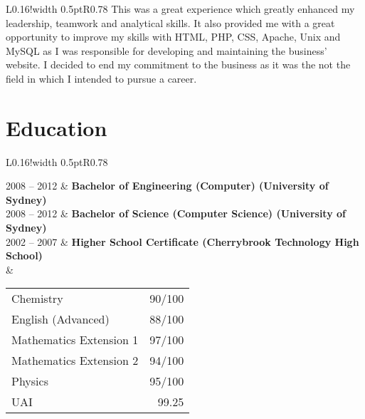 \documentclass[10pt]{article}
\newcommand\VRule{\color{lightgray}\vrule width 0.5pt}
\newcommand{\education}[4]{%
#1 -- #2 & {\bf #3 (#4)} \\ %
}
\begin{document}
\begin{longtable}{L{0.16}!{\VRule}R{0.78}}
{This was a great experience which greatly enhanced my leadership, teamwork and 
analytical skills. It also provided me with a great opportunity to improve my 
skills with HTML, PHP, CSS, Apache, Unix and MySQL as I was responsible for 
developing and maintaining the business' website. I decided to end my commitment
to the business as it was the not the field in which I intended to pursue a 
career.}
{}
\begin{comment}
\item Web development
\begin{itemize}
	\item HTML
	\item PHP
	\item CSS
\end{itemize}

\item Web administration
\begin{itemize}
	\item Apache
	\item Unix
	\item MySQL
\end{itemize}
\end{comment}

\makeatletter
\global\def \lwidth{\@undefined}
\global\def \rwidth{\@undefined}
\makeatother

\end{longtable}

\section*{Education}
\begin{longtable}{L{0.16}!{\VRule}R{0.78}}

\education{2008}{2012}{Bachelor of Engineering (Computer)}{University of Sydney}

\education{2008}{2012}{Bachelor of Science (Computer Science)}{University of Sydney}

\education{2002}{2007}{Higher School Certificate}{Cherrybrook Technology High School}
& \begin{tabularx}{0.78\textwidth}{Xr}
Chemistry &					90/100 \\
English (Advanced) & 		88/100 \\
Mathematics Extension 1 &	97/100 \\
Mathematics Extension 2 & 	94/100 \\
Physics & 					95/100 \\
UAI & 						99.25
\end{tabularx}

\end{longtable}
\end{document}
